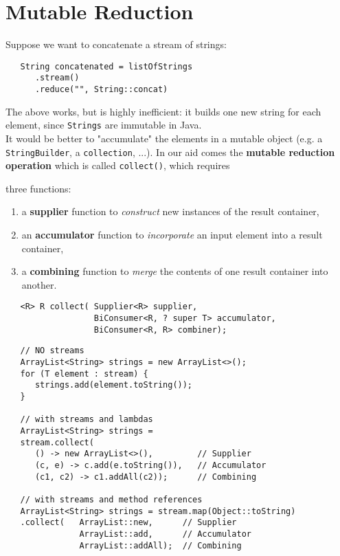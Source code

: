 \section{Mutable Reduction}

Suppose we want to concatenate a stream of strings:
\begin{lstlisting}
   String concatenated = listOfStrings
      .stream()
      .reduce("", String::concat)
\end{lstlisting}
The above works, but is highly inefficient: it builds one new string for each element, since \lstinline|Strings| are immutable in Java.\\
It would be better to "accumulate" the elements in a mutable object (e.g. a \lstinline|StringBuilder|, a \lstinline|collection|, ...).
In our aid comes the \textbf{mutable reduction operation} which is called \lstinline|collect()|, which requires
{three functions:\ns
\begin{enumerate}
   \item a \textbf{supplier} function to \textit{construct} new instances of the result container,
   \item an \textbf{accumulator} function to \textit{incorporate} an input element into a result container,
   \item a \textbf{combining} function to \textit{merge} the contents of one result container into another.
\end{enumerate}}
\begin{lstlisting}
   <R> R collect( Supplier<R> supplier,
                  BiConsumer<R, ? super T> accumulator,
                  BiConsumer<R, R> combiner);
\end{lstlisting}

\begin{lstlisting}
   // NO streams
   ArrayList<String> strings = new ArrayList<>();
   for (T element : stream) {
      strings.add(element.toString());
   }

   // with streams and lambdas
   ArrayList<String> strings =
   stream.collect(
      () -> new ArrayList<>(),         // Supplier
      (c, e) -> c.add(e.toString()),   // Accumulator
      (c1, c2) -> c1.addAll(c2));      // Combining
   
   // with streams and method references
   ArrayList<String> strings = stream.map(Object::toString)
   .collect(   ArrayList::new,      // Supplier
               ArrayList::add,      // Accumulator
               ArrayList::addAll);  // Combining
\end{lstlisting}

